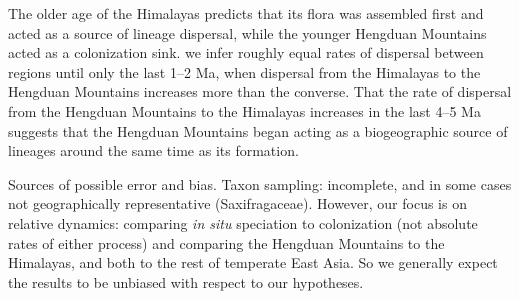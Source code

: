 The older age of the Himalayas predicts that its flora was assembled first and acted as a source of lineage dispersal, while the younger Hengduan Mountains acted as a colonization sink. %
we infer roughly equal rates of dispersal between regions until only the last 1--2 Ma, when dispersal from the Himalayas to the Hengduan Mountains increases more than the converse. That the rate of dispersal from the Hengduan Mountains to the Himalayas increases in the last 4--5 Ma suggests that the Hengduan Mountains began acting as a biogeographic source of lineages around the same time as its formation. %


Sources of possible error and bias. Taxon sampling: incomplete, and in some cases not geographically representative (Saxifragaceae). However, our focus is on relative dynamics: comparing \textit{in situ} speciation to colonization (not absolute rates of either process) and comparing the Hengduan Mountains to the Himalayas, and both to the rest of temperate East Asia. So we generally expect the results to be unbiased with respect to our hypotheses.



